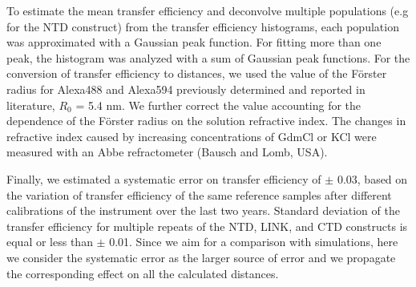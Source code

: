 \documentclass[../main.tex]{subfiles}
\begin{document}
        To estimate the mean transfer efficiency and deconvolve multiple populations (e.g for the NTD construct) from the transfer efficiency histograms, each population was approximated with a Gaussian peak function. For fitting more than one peak, the histogram was analyzed with a sum of Gaussian peak functions. For the conversion of transfer efficiency to distances, we used the value of the Förster radius for Alexa488 and Alexa594 previously determined and reported in literature, $R_0$ = 5.4 nm\cite{Schuler2002-hf}. We further correct the value accounting for the dependence of the Förster radius on the solution refractive index. The changes in refractive index caused by increasing concentrations of GdmCl or KCl were measured with an Abbe refractometer (Bausch and Lomb, USA). 

        Finally, we estimated a systematic error on transfer efficiency of $\pm$ 0.03, based on the variation of transfer efficiency of the same reference samples after different calibrations of the instrument over the last two years. Standard deviation of the transfer efficiency for multiple repeats of the NTD, LINK, and CTD constructs is equal or less than $\pm$ 0.01. Since we aim for a comparison with simulations, here we consider the systematic error as the larger source of error and we propagate the corresponding effect on all the calculated distances. 
\end{document}
